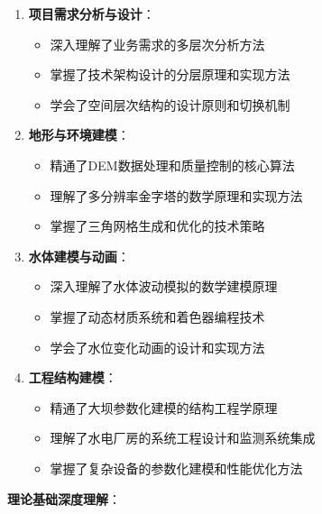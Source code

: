 \begin{enumerate}
\def\labelenumi{\arabic{enumi}.}
\tightlist
\item
  \textbf{项目需求分析与设计}：

  \begin{itemize}
  \tightlist
  \item
    深入理解了业务需求的多层次分析方法
  \item
    掌握了技术架构设计的分层原理和实现方法
  \item
    学会了空间层次结构的设计原则和切换机制
  \end{itemize}
\item
  \textbf{地形与环境建模}：

  \begin{itemize}
  \tightlist
  \item
    精通了DEM数据处理和质量控制的核心算法
  \item
    理解了多分辨率金字塔的数学原理和实现方法
  \item
    掌握了三角网格生成和优化的技术策略
  \end{itemize}
\item
  \textbf{水体建模与动画}：

  \begin{itemize}
  \tightlist
  \item
    深入理解了水体波动模拟的数学建模原理
  \item
    掌握了动态材质系统和着色器编程技术
  \item
    学会了水位变化动画的设计和实现方法
  \end{itemize}
\item
  \textbf{工程结构建模}：

  \begin{itemize}
  \tightlist
  \item
    精通了大坝参数化建模的结构工程学原理
  \item
    理解了水电厂房的系统工程设计和监测系统集成
  \item
    掌握了复杂设备的参数化建模和性能优化方法
  \end{itemize}
\end{enumerate}

\textbf{理论基础深度理解}：

